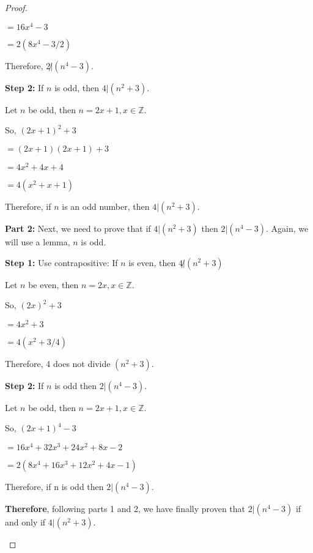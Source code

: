\documentclass[10pt]{article} %
\newcommand{\Z}{\mathbb{Z}}
\begin{document}
\begin{enumerate}
\begin{proof}
\begin{center}
$ = 16x^4 - 3$

$ = 2(8x^4 - 3/2)$

Therefore, $2 \not| (n^4-3)$.  
\end{center}

\begin{center} {\bf Step 2:} If $n$ is odd, then $4 | (n^2+3)$.  

Let $n$ be odd, then $n = 2x + 1, x \in \Z$.  

So, $(2x + 1)^2 + 3$

$ = (2x + 1)(2x + 1) + 3$

$ = 4x^2 + 4x + 4$

$ = 4(x^2 + x + 1)$

Therefore, if $n$ is an odd number, then $4 | (n^2+3)$.  
\end{center}


\begin{raggedright} {\bf Part 2:} Next, we need to prove that if $4 | (n^2+3)$ then $2 | (n^4-3)$.  Again, we will use a lemma, $n$ is odd.  
\end{raggedright}

\begin{center} {\bf Step 1:} Use contrapositive: If $n$ is even, then $4 \not| (n^2+3)$

Let $n$ be even, then $n = 2x, x \in \Z$.  

So, $(2x)^2 + 3$

$ = 4x^2 + 3$

$ = 4(x^2 + 3/4)$

Therefore, 4 does not divide $(n^2 + 3)$.  
\end{center}
\begin{center} {\bf Step 2:} If $n$ is odd then $2 | (n^4-3)$.  

Let $n$ be odd, then $n = 2x + 1, x \in \Z$.  

So, $(2x + 1)^4 - 3$

$ = 16x^4 + 32x^3 + 24x^2 + 8x - 2$

$ = 2(8x^4 + 16x^3 + 12x^2 + 4x - 1)$

Therefore, if n is odd then $2 | (n^4-3)$.  
\end{center}
\begin{center} {\bf Therefore}, following parts 1 and 2, we have finally proven that $2 | (n^4-3)$ if and only if $4 | (n^2+3)$.  \end{center}

\end{proof}

\bigskip


\end{enumerate}
\end{document}
